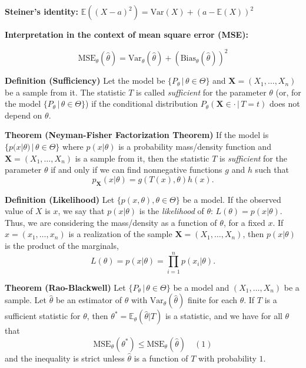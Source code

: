 \documentclass[12pt,a4paper,oneside]{book} %
\begin{document}
\textbf{Steiner's identity:} $\mathbb{E}((X - a)^2) = \text{Var}(X) + (a - \mathbb{E}(X))^2$

\textbf{Interpretation in the context of mean square error (MSE):}

\[ \text{MSE}_{\theta}(\hat{\theta}) = \text{Var}_{\theta}(\hat{\theta}) + (\text{Bias}_{\theta}(\hat{\theta}))^2 \]

\textbf{Definition (Sufficiency)} Let the model be $\{P_{\theta} \,|\, \theta \in \Theta\}$ and $\mathbf{X} = (X_1, \ldots, X_n)$ be a sample from it. The statistic $T$ is called \textit{sufficient} for the parameter $\theta$ (or, for the model $\{P_{\theta} \,|\, \theta \in \Theta\}$) if the conditional distribution $P_{\theta}(\mathbf{X} \in \cdot \,|\, T = t)$ does not depend on $\theta$.

\textbf{Theorem (Neyman-Fisher Factorization Theorem)} If the model is $\{p(x|\theta) \,|\, \theta \in \Theta\}$ where $p(x|\theta)$ is a probability mass/density function and $\mathbf{X} = (X_1, \ldots, X_n)$ is a sample from it, then the statistic $T$ is \textit{sufficient} for the parameter $\theta$ if and only if we can find nonnegative functions $g$ and $h$ such that
\[ p_{\mathbf{X}}(x | \theta) = g(T(x), \theta)h(x). \]

\textbf{Definition (Likelihood)} Let $\{p(x, \theta), \theta \in \Theta\}$ be a model. If the observed value of $X$ is $x$, we say that $p(x | \theta)$ is the \textit{likelihood} of $\theta$: $L(\theta) = p(x | \theta)$. Thus, we are considering the mass/density as a function of $\theta$, for a fixed $x$. If $x = (x_1, \ldots, x_n)$ is a realization of the sample $\mathbf{X} = (X_1, \ldots, X_n)$, then $p(x | \theta)$ is the product of the marginals,
\[ L(\theta) = p(x | \theta) = \prod_{i=1}^{n} p(x_i | \theta). \]

\textbf{Theorem (Rao-Blackwell)} Let $\{P_{\theta} \,|\, \theta \in \Theta\}$ be a model and $(X_1, \ldots, X_n)$ be a sample. Let $\hat{\theta}$ be an estimator of $\theta$ with $\text{Var}_{\theta}(\hat{\theta})$ finite for each $\theta$. If $T$ is a sufficient statistic for $\theta$, then $\theta^* = \mathbb{E}_{\theta}(\hat{\theta} | T)$ is a statistic, and we have for all $\theta$ that
\[ \text{MSE}_{\theta}(\theta^*) \leq \text{MSE}_{\theta}(\hat{\theta}) \quad (1) \]
and the inequality is strict unless $\hat{\theta}$ is a function of $T$ with probability $1$.





	\clearpage
	
\end{document}
